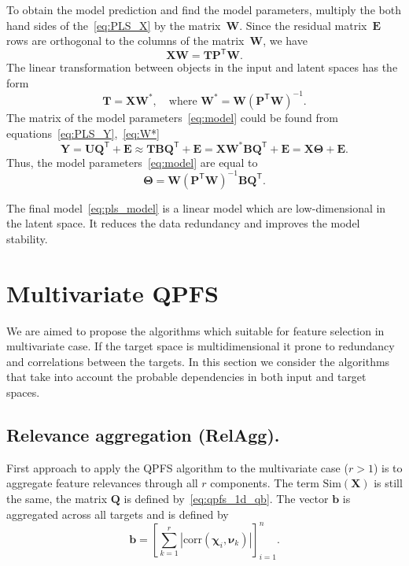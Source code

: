 \documentclass[12pt,oneside]{article}
\theoremstyle{definition}
\newcommand{\bb}{\mathbf{b}}
\newcommand{\bY}{\mathbf{Y}}
\newcommand{\bX}{\mathbf{X}}
\newcommand{\bP}{\mathbf{P}}
\newcommand{\bT}{\mathbf{T}}
\newcommand{\bB}{\mathbf{B}}
\newcommand{\bQ}{\mathbf{Q}}
\newcommand{\bE}{\mathbf{E}}
\newcommand{\bU}{\mathbf{U}}
\newcommand{\bW}{\mathbf{W}}
\newcommand{\T}{\mathsf{T}}
\newcommand{\bchi}{\boldsymbol{\chi}}
\newcommand{\bnu}{\boldsymbol{\nu}}
\newcommand{\bTheta}{\boldsymbol{\Theta}}
\begin{document}
To obtain the model prediction and find the model parameters, multiply the both hand sides of the~\eqref{eq:PLS_X} by the matrix~$\bW$. 
Since the residual matrix~$\bE$ rows are orthogonal to the columns of the matrix~$\bW$, we have
\begin{equation}
\bX \bW = \bT \bP^{\T} \bW.
\end{equation}
The linear transformation between objects in the input and latent spaces has the form
\begin{equation}
\bT = \bX \bW^*, \quad \text{where } \bW^* = \bW (\bP^{\T} \bW)^{-1}.
\label{eq:W*}
\end{equation}
The matrix of the model parameters~\ref{eq:model} could be found from equations~\eqref{eq:PLS_Y},~\eqref{eq:W*}
\begin{equation}
\bY = \bU \bQ^{\T} + \bE \approx \bT \bB \bQ^{\T}+ \bE = \bX \bW^* \bB \bQ^{\T} + \bE = \bX \bTheta + \bE.
\label{eq:pls_model}
\end{equation}
Thus, the model parameters~\eqref{eq:model} are equal to
\begin{equation}
\bTheta = \bW (\bP^{\T} \bW)^{-1} \bB \bQ^{\T}.
\label{eq:model_parameters}
\end{equation}

The final model~\eqref{eq:pls_model} is a linear model which are low-dimensional in the latent space. 
It reduces the data redundancy and improves the model stability. 

\newpage
\section{Multivariate QPFS}

We are aimed to propose the algorithms which suitable for feature selection in multivariate case. 
If the target space is multidimensional it prone to redundancy and correlations between the targets. 
In this section we consider the algorithms that take into account the probable dependencies in both input and target spaces.

\subsection{Relevance aggregation (RelAgg).}

First approach to apply the QPFS algorithm to the multivariate case ($r > 1$) is to aggregate feature relevances through all $r$ components. The term $\text{Sim}(\bX)$ is still the same, the matrix $\bQ$ is defined by~\eqref{eq:qpfs_1d_qb}. The vector $\bb$ is aggregated across all targets and is defined by
\begin{equation}
\bb = \left[\sum_{k=1}^r\left|\text{corr}(\bchi_i, \bnu_k)\right|\right]_{i=1}^n.
\end{equation}
\end{document}
